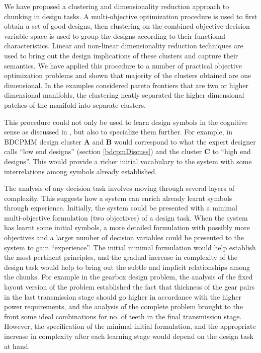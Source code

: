 

We have proposed a clustering and dimensionality reduction approach to
chunking in design tasks. A multi-objective optimization procedure is used
to first obtain a set of good designs, then clustering on the combined
objective-decision variable space is used to group the designs according to
their functional characteristics. Linear and non-linear dimensionality
reduction techniques are used to bring out the design implications of these
clusters and capture their semantics. We have applied this procedure to a
number of practical objective optimization problems and shown that majority
of the clusters obtained are one dimensional. In the examples considered
pareto frontiers that are two or higher dimensional manifolds, the
clustering neatly separated the higher dimensional patches of the manifold
into separate clusters.

This procedure could not only be used to learn design symbols in the
cognitive sense as discussed in \citep{mukerjee09}, but also to specialize
them further. For example, in BDCPMM design cluster \textbf{A} and
\textbf{B} would correspond to what the expert designer calls ``low end
designs'' (section \ref{bdcpmDiscuss}) and the cluster \textbf{C} to ``high
end designs''. This would provide a richer initial vocabulary to the system
with some interrelations among symbols already established.

The analysis of any decision task involves moving through several layers of
complexity. This suggests how a system can enrich already learnt symbols
through experience. Initially, the system could be presented with a minimal
multi-objective formulation (two objectives) of a design task. When the
system has learnt some initial symbols, a more detailed formulation with
possibly more objectives and a larger number of decision variables could be
presented to the system to gain ``experience''. The initial minimal
formulation would help establish the most pertinent principles, and the
gradual increase in complexity of the design task would help to bring out
the subtle and implicit relationships among the chunks. For example in the
gearbox design problem, the analysis of the fixed layout version of the
problem established the fact that thickness of the gear pairs in the last
transmission stage should go higher in accordance with the higher power
requirements, and the analysis of the complete problem brought to the front
some ideal combinations for no. of teeth in the final transmission
stage. However, the specification of the minimal initial formulation, and
the appropriate increase in complexity after each learning stage would
depend on the design task at hand.

